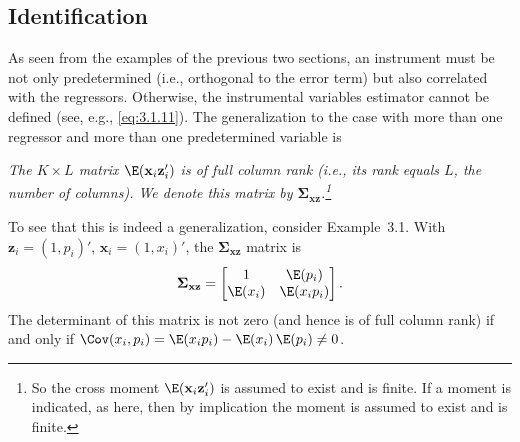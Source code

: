\subsection*{Identification}

As seen from the examples of the previous two sections, an instrument must be not
only predetermined (i.e., orthogonal to the error term) but also correlated with the
regressors.  Otherwise, the instrumental variables estimator cannot be defined (see,
e.g., \eqref{eq:3.1.11}).  The generalization to the case with more than one regressor and
more than one predetermined variable is

\begin{assumption}
\label{ass:3.4}
\emph{The $K \times L$ matrix $\E(\mathbf{x}_i \mathbf{z}_i')$
is of full column rank (i.e., its rank equals $L$, the number of columns).  We
denote this matrix by $\boldsymbol{\Sigma}_{\mathbf{xz}}$.\footnote{So the cross moment
$\E(\mathbf{x}_i \mathbf{z}_i')$ is assumed to exist and is finite.  If a moment is indicated, as here,
then by implication the moment is assumed to exist and is finite.}}
\end{assumption}

To see that this is indeed a generalization, consider Example~3.1.  With
$\mathbf{z}_i = (1, p_i)'$, $\mathbf{x}_i = (1, x_i)'$, the $\boldsymbol{\Sigma}_{\mathbf{xz}}$
matrix is
\[
  \boldsymbol{\Sigma}_{\mathbf{xz}}
  = \begin{bmatrix} 1 & \E(p_i) \\ \E(x_i) & \E(x_i p_i) \end{bmatrix}.
\]
The determinant of this matrix is not zero (and hence is of full column rank) if and
only if $\Cov(x_i, p_i) = \E(x_i p_i) - \E(x_i)\,\E(p_i) \neq 0$.

